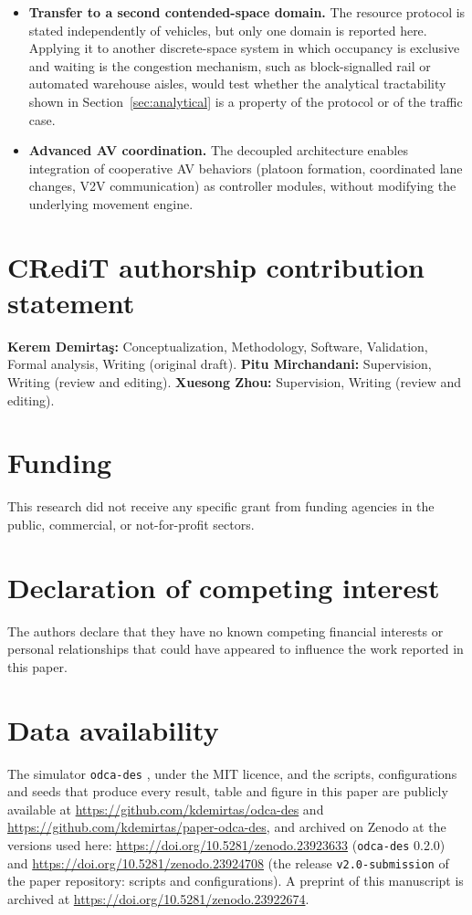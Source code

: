 \documentclass[review,number]{elsarticle}
\begin{document}
\begin{itemize}
    \item \textbf{Transfer to a second contended-space domain.} The resource protocol is stated independently of vehicles, but only one domain is reported here. Applying it to another discrete-space system in which occupancy is exclusive and waiting is the congestion mechanism, such as block-signalled rail or automated warehouse aisles, would test whether the analytical tractability shown in Section~\ref{sec:analytical} is a property of the protocol or of the traffic case.

    \item \textbf{Advanced AV coordination.} The decoupled architecture enables integration of cooperative AV behaviors (platoon formation, coordinated lane changes, V2V communication) as controller modules, without modifying the underlying movement engine.
\end{itemize}


\section*{CRediT authorship contribution statement}
\textbf{Kerem Demirta\c{s}:} Conceptualization, Methodology, Software, Validation, Formal analysis, Writing (original draft).
\textbf{Pitu Mirchandani:} Supervision, Writing (review and editing).
\textbf{Xuesong Zhou:} Supervision, Writing (review and editing).

\section*{Funding}
This research did not receive any specific grant from funding agencies in the public, commercial, or not-for-profit sectors.

\section*{Declaration of competing interest}
The authors declare that they have no known competing financial interests or personal relationships that could have appeared to influence the work reported in this paper.

\section*{Data availability}
The simulator \texttt{odca-des} \citep{demirtas2026odcades}, under the MIT licence, and the scripts, configurations and seeds that produce every result, table and figure in this paper are publicly available at \url{https://github.com/kdemirtas/odca-des} and \url{https://github.com/kdemirtas/paper-odca-des}, and archived on Zenodo at the versions used here: \url{https://doi.org/10.5281/zenodo.23923633} (\texttt{odca-des} 0.2.0) and \url{https://doi.org/10.5281/zenodo.23924708} (the release \texttt{v2.0-submission} of the paper repository: scripts and configurations). A preprint of this manuscript is archived at \url{https://doi.org/10.5281/zenodo.23922674}.
\end{document}
